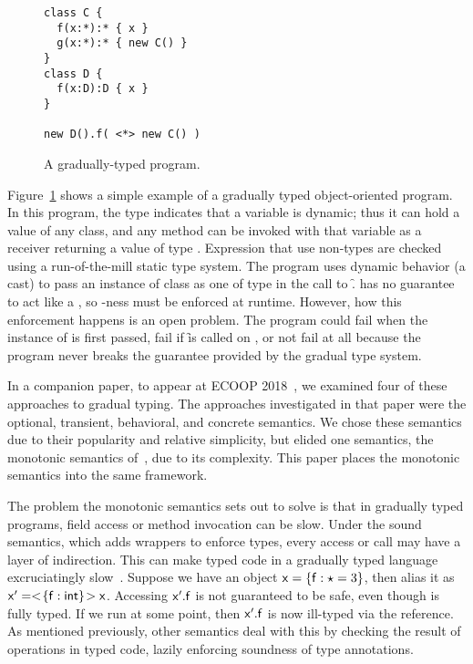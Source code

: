 \documentclass[sigconf]{acmart}
\begin{document}
\begin{figure}[h]
\begin{lstlisting}
class C { 
  f(x:*):* { x } 
  g(x:*):* { new C() }
}
class D { 
  f(x:D):D { x }
}

new D().f( <*> new C() )
\end{lstlisting}
\caption{A gradually-typed program.}
\label{fig:simpleprog}
\end{figure}

Figure~\ref{fig:simpleprog} shows a simple example of a gradually typed
object-oriented program. In this program, the type \any indicates that a
variable is dynamic; thus it can hold a value of any class, and any method
can be invoked with that variable as a receiver returning a value of type
\any. Expression that use non-\any types are checked using a run-of-the-mill
static type system. The program uses dynamic behavior (a cast) to pass an
instance of class \C as one of type \D in the call to \f. \C has no
guarantee to act like a \D, so \D-ness must be enforced at runtime. However,
how this enforcement happens is an open problem. The program could fail when
the instance of \C is first passed, fail if \f is called on \x, or not fail
at all because the program never breaks the guarantee provided by the
gradual type system.

In a companion paper, to appear at ECOOP 2018~\cite{us}, we examined four of
these approaches to gradual typing.  The approaches investigated in that
paper were the optional, transient, behavioral, and concrete semantics. We
chose these semantics due to their popularity and relative simplicity, but
elided one semantics, the monotonic semantics of~\cite{siek14}, due to its
complexity. This paper places the monotonic semantics into the same
framework.

The problem the monotonic semantics sets out to solve is that in gradually
typed programs, field access or method invocation can be slow. Under the
sound semantics, which adds wrappers to enforce types, every access or call
may have a layer of indirection. This can make typed code in a gradually
typed language excruciatingly slow~\cite{popl16}.  Suppose we have an object
$\x = \{ \f:\any = 3 \}$, then alias it as $\xp = \SubCast{\{ \f:\xt{int}
  \}}\x$. Accessing $\xp.\f$ is not guaranteed to be safe, even though \xp
is fully typed. If we run  at some point, then $\xp.\f$
is now ill-typed via the reference. As mentioned previously, other semantics
deal with this by checking the result of operations in typed code, lazily
enforcing soundness of type annotations.
\end{document}
